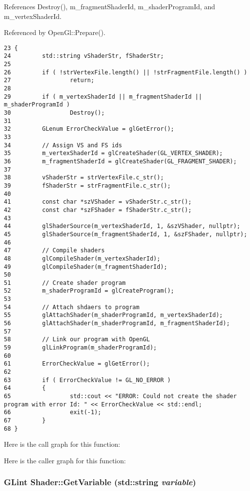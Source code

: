 References Destroy(), m\_\-fragmentShaderId, m\_\-shaderProgramId, and m\_\-vertexShaderId.

Referenced by OpenGl::Prepare().

\begin{Code}\begin{verbatim}23 {
24         std::string vShaderStr, fShaderStr;
25 
26         if ( !strVertexFile.length() || !strFragmentFile.length() )
27                 return;
28 
29         if ( m_vertexShaderId || m_fragmentShaderId || m_shaderProgramId )
30                 Destroy();
31 
32         GLenum ErrorCheckValue = glGetError();
33 
34         // Assign VS and FS ids
35         m_vertexShaderId = glCreateShader(GL_VERTEX_SHADER);
36         m_fragmentShaderId = glCreateShader(GL_FRAGMENT_SHADER);
37 
38         vShaderStr = strVertexFile.c_str();
39         fShaderStr = strFragmentFile.c_str();
40 
41         const char *szVShader = vShaderStr.c_str();
42         const char *szFShader = fShaderStr.c_str();
43 
44         glShaderSource(m_vertexShaderId, 1, &szVShader, nullptr);
45         glShaderSource(m_fragmentShaderId, 1, &szFShader, nullptr);
46         
47         // Compile shaders
48         glCompileShader(m_vertexShaderId);
49         glCompileShader(m_fragmentShaderId);
50 
51         // Create shader program
52         m_shaderProgramId = glCreateProgram();
53 
54         // Attach shdaers to program
55         glAttachShader(m_shaderProgramId, m_vertexShaderId);
56         glAttachShader(m_shaderProgramId, m_fragmentShaderId);
57 
58         // Link our program with OpenGL
59         glLinkProgram(m_shaderProgramId);
60 
61         ErrorCheckValue = glGetError();
62 
63         if ( ErrorCheckValue != GL_NO_ERROR )
64         {
65                 std::cout << "ERROR: Could not create the shader program with error Id: " << ErrorCheckValue << std::endl;
66                 exit(-1);
67         }
68 }
\end{verbatim}
\end{Code}




Here is the call graph for this function:

Here is the caller graph for this function:\hypertarget{class_shader_1230582b9f5d71bde3614683244e1a83}{
\subsubsection[GetVariable]{\setlength{\rightskip}{0pt plus 5cm}GLint Shader::GetVariable (std::string {\em variable})}}
\label{class_shader_1230582b9f5d71bde3614683244e1a83}


